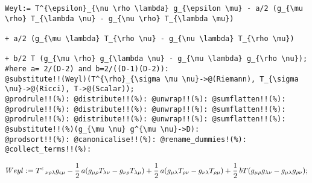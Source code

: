 \documentclass[11pt]{article}
\def\specialcolon{\mathrel{\mathop{:}}\hspace{-.5em}}
\begin{document}
{\color[named]{Blue}\begin{verbatim}
Weyl:= T^{\epsilon}_{\nu \rho \lambda} g_{\epsilon \mu} - a/2 (g_{\mu \rho} T_{\lambda \nu} - g_{\nu \rho} T_{\lambda \mu})
                                                                                              + a/2 (g_{\mu \lambda} T_{\rho \nu} - g_{\nu \lambda} T_{\rho \mu})
                                                                                               + b/2 T (g_{\mu \rho} g_{\lambda \nu} - g_{\mu \lambda} g_{\rho \nu});
#here a= 2/(D-2) and b=2/((D-1)(D-2)):
@substitute!!(Weyl)(T^{\rho}_{\sigma \mu \nu}->@(Riemann), T_{\sigma \nu}->@(Ricci), T->@(Scalar));
@prodrule!!(%): @distribute!!(%): @unwrap!!(%): @sumflatten!!(%):
@prodrule!!(%): @distribute!!(%): @unwrap!!(%): @sumflatten!!(%):
@prodrule!!(%): @distribute!!(%): @unwrap!!(%): @sumflatten!!(%):
@substitute!!(%)(g_{\mu \nu} g^{\mu \nu}->D):
@prodsort!!(%): @canonicalise!!(%): @rename_dummies!(%): @collect_terms!!(%):
\end{verbatim}}
\begin{dmath*}[compact, spread=2pt]
Weyl\specialcolon{}= {T}^{\epsilon}\,_{\nu \rho \lambda} {g}_{\epsilon \mu} - \frac{1}{2}\, a ({g}_{\mu \rho} {T}_{\lambda \nu} - {g}_{\nu \rho} {T}_{\lambda \mu}) + \frac{1}{2}\, a ({g}_{\mu \lambda} {T}_{\rho \nu} - {g}_{\nu \lambda} {T}_{\rho \mu}) + \frac{1}{2}\, b T ({g}_{\mu \rho} {g}_{\lambda \nu} - {g}_{\mu \lambda} {g}_{\rho \nu});
\end{dmath*}
\end{document}
